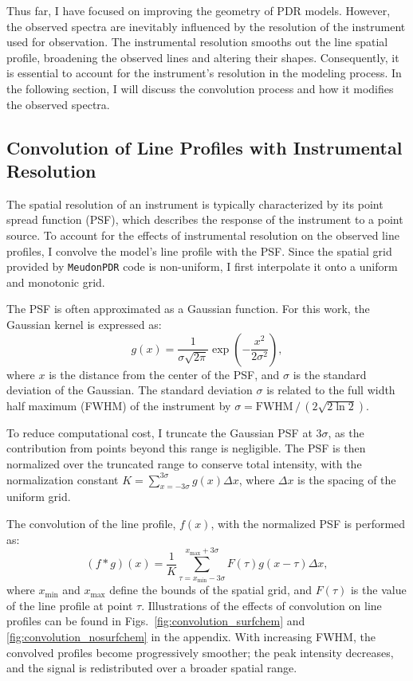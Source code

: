 \documentclass[12pt,a4paper]{article}
\newcommand{\mdpdr}{\texttt{MeudonPDR} code}
\begin{document}
Thus far, I have focused on improving the geometry of PDR models. However, the observed spectra are inevitably influenced by the resolution of the instrument used for observation. The instrumental resolution smooths out the line spatial profile, broadening the observed lines and altering their shapes. Consequently, it is essential to account for the instrument's resolution in the modeling process. In the following section, I will discuss the convolution process and how it modifies the observed spectra.

\subsection{Convolution of Line Profiles with Instrumental Resolution} \label{sec:convolution}

The spatial resolution of an instrument is typically characterized by its point spread function (PSF), which describes the response of the instrument to a point source. To account for the effects of instrumental resolution on the observed line profiles, I convolve the model's line profile with the PSF. Since the spatial grid provided by \mdpdr{} is non-uniform, I first interpolate it onto a uniform and monotonic grid.

The PSF is often approximated as a Gaussian function. For this work, the Gaussian kernel is expressed as:
\begin{equation}
    g(x) = \frac{1}{\sigma\sqrt{2\pi}}\exp(-\frac{x^2}{2\sigma^2}),
\end{equation}
where $x$ is the distance from the center of the PSF, and $\sigma$ is the standard deviation of the Gaussian. The standard deviation $\sigma$ is related to the full width half maximum (FWHM) of the instrument by $\sigma = \text{FWHM}\,/\,(2\sqrt{2 \ln 2})$.

To reduce computational cost, I truncate the Gaussian PSF at $3\sigma$, as the contribution from points beyond this range is negligible. The PSF is then normalized over the truncated range to conserve total intensity, with the normalization constant $K = \sum_{x=-3\sigma}^{3\sigma} g(x) \Delta x$, where $\Delta x$ is the spacing of the uniform grid.

The convolution of the line profile, $f(x)$, with the normalized PSF is performed as:
\begin{equation}
    (f * g) (x) = \frac{1}{K} \sum_{\tau = x_{\min} - 3\sigma}^{x_{\max} + 3\sigma}F(\tau)g(x - \tau)\Delta x,
\end{equation}
where $x_{\min}$ and $x_{\max}$ define the bounds of the spatial grid, and $F(\tau)$ is the value of the line profile at point $\tau$. Illustrations of the effects of convolution on line profiles can be found in Figs.~\ref{fig:convolution_surfchem} and \ref{fig:convolution_nosurfchem} in the appendix. With increasing FWHM, the convolved profiles become progressively smoother; the peak intensity decreases, and the signal is redistributed over a broader spatial range.
\end{document}
